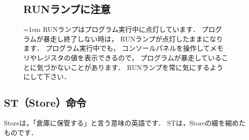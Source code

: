 \begin{figure}[btp]
  \begin{framed}
    \subsection*{RUNランプに注意}{\parindent=1em
      RUNランプはプログラム実行中に点灯しています．
      プログラムが暴走し終了しない時は，
      RUNランプが点灯したままになります．
      プログラム実行中でも，
      コンソールパネルを操作してメモリやレジスタの値を表示できるので，
      プログラムが暴走していることに気づかないことがあります．
      RUNランプを常に気にするようにして下さい．
  }\end{framed}
\end{figure}

\newpage
\subsection{ST（Store）命令}
Storeは，「倉庫に保管する」と言う意味の英語です．
STは，Storeの綴を縮めたものです．

